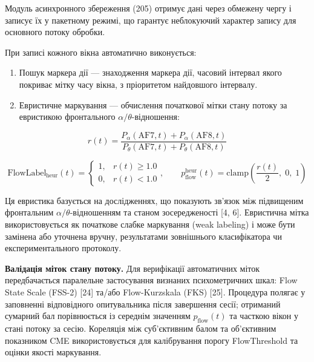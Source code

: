 \documentclass[12pt,a4paper]{article}
\begin{document}
Модуль асинхронного збереження (205) отримує дані через обмежену чергу і записує їх у пакетному режимі, що гарантує неблокуючий характер запису для основного потоку обробки.



При записі кожного вікна автоматично виконується:



\begin{enumerate}

\def\labelenumi{\arabic{enumi}.}

\item

  Пошук маркера дії --- знаходження маркера дії, часовий інтервал якого покриває мітку часу вікна, з пріоритетом найдовшого інтервалу.

\item

  Евристичне маркування --- обчислення початкової мітки стану потоку за евристикою фронтального \(\alpha/\theta\)-відношення:

\end{enumerate}



\[r(t) = \frac{P_\alpha(\text{AF7}, t) + P_\alpha(\text{AF8}, t)}{P_\theta(\text{AF7}, t) + P_\theta(\text{AF8}, t)}\]



\[\text{FlowLabel}_{\text{heur}}(t) = \begin{cases}1, & r(t) \geq 1.0 \\ 0, & r(t) < 1.0\end{cases}, \qquad p_{\text{flow}}^{\text{heur}}(t) = \text{clamp}\!\left(\frac{r(t)}{2},\;0,\;1\right)\]



Ця евристика базується на дослідженнях, що показують зв'язок між підвищеним фронтальним \(\alpha/\theta\)-відношенням та станом зосередженості {[}4, 6{]}. Евристична мітка використовується як початкове слабке маркування (weak labeling) і може бути замінена або уточнена вручну, результатами зовнішнього класифікатора чи експериментального протоколу.



\textbf{Валідація міток стану потоку.} Для верифікації автоматичних міток передбачається паралельне застосування визнаних психометричних шкал: Flow State Scale (FSS-2) {[}24{]} та/або Flow-Kurzskala (FKS) {[}25{]}. Процедура полягає у заповненні відповідного опитувальника після завершення сесії; отриманий сумарний бал порівнюється із середнім значенням \(p_{\text{flow}}(t)\) та часткою вікон у стані потоку за сесію. Кореляція між суб'єктивним балом та об'єктивним показником CME використовується для калібрування порогу FlowThreshold та оцінки якості маркування.
\end{document}
